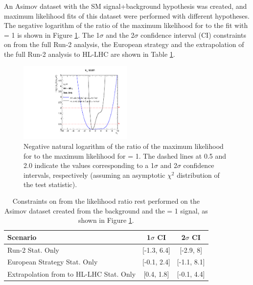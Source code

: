 An Asimov dataset with the SM signal+background hypothesis was created, and maximum likelihood fits of this dataset were performed with different \kl hypotheses. The negative logarithm of the ratio of the maximum likelihood for \kl to the fit with \kl= 1 is shown in Figure \ref{fig:HL-LHC:LH}. The 1$\sigma$ and the 2$\sigma$ confidence interval (CI) constraints on \kl from the full Run-2 analysis, the European strategy and the extrapolation of the full Run-2 analysis to HL-LHC are shown in Table \ref{tab:HL-LHC:kl}. 

\begin{figure}[htbp]
    \centering
    \includegraphics[width=0.5\textwidth]{Ch6/Img/likelihood_subplot_14TeV.pdf}
    \begin{tcolorbox}[colback=black!5!white, colframe=white!75!black]
    \caption{Negative natural logarithm of the ratio of the maximum likelihood for \kl to the maximum likelihood for \kl= 1. The dashed lines at 0.5 and 2.0 indicate the values corresponding to a 1$\sigma$ and 2$\sigma$ confidence intervals, respectively (assuming an asymptotic $\chi^2$ distribution of the test statistic).}
    \label{fig:HL-LHC:LH}
    \end{tcolorbox}
\end{figure}

\begin{table}[htbp]
    \centering
    \begin{tabular}{lcc}
    \hline\hline 
        Scenario & 1$\sigma$ CI & 2$\sigma$ CI \\
    \hline    
        Run-2 Stat. Only & [-1.3, 6.4]  & [-2.9, 8] \\ 
        European Strategy Stat. Only & [-0.1, 2.4] & [-1.1, 8.1] \\
        Extrapolation from to HL-LHC Stat. Only & [0.4, 1.8] & [-0.1, 4.4] \\
    \hline\hline 
    \end{tabular}
    \begin{tcolorbox}[colback=black!5!white, colframe=white!75!black]
    \caption{Constraints on \kl from the likelihood ratio rest performed on the Asimov dataset created from the background and the \kl= 1 signal, as shown in Figure \ref{fig:HL-LHC:LH}.}
    \label{tab:HL-LHC:kl}
    \end{tcolorbox}
\end{table}

